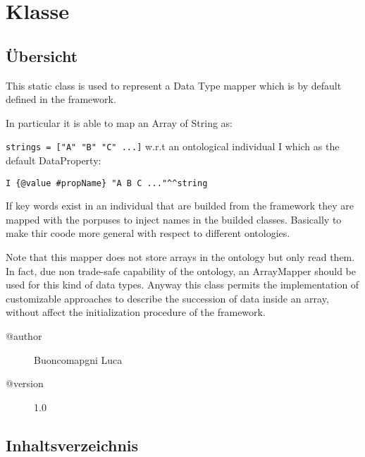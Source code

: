 
\section[KeyWordsMapper]{Klasse }\label{ontologyFramework.OFDataMapping.ReservatedDataType.KeyWordsMapper-class}
\subsection{Übersicht}
This static class is used to represent a Data Type mapper
 which is by default defined in the framework.
 
 In particular it is able to map an Array of String as:\mbox{}\newline

 \verb!strings = ["A" "B" "C" ...]!
 w.r.t an ontological individual I which as the default DataProperty:\mbox{}\newline

 \verb!I {@value #propName} "A B C ..."^^string! 
 
 If key words exist in an individual that are builded from the 
 framework they are mapped with the porpuses to inject names
 in the builded classes. Basically to make thir coode more
 general with respect to different ontologies. 
 
 Note that this mapper does not store arrays in the ontology
 but only read them. In fact, due non trade-safe capability
 of the ontology, an ArrayMapper should be used for this kind
 of data types. Anyway this class permits the implementation
 of customizable approaches to describe the succession of data inside 
 an array, without affect the initialization procedure
 of the framework.
\begin{description}
\item[@author] 
Buoncomapgni Luca
\item[@version] 
1.0
\end{description}
\subsection{Inhaltsverzeichnis}
